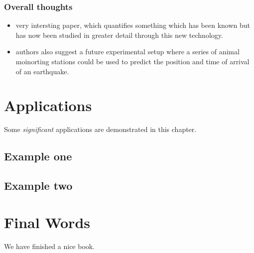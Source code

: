 \documentclass[
]{book}
\begin{document}
\hypertarget{overall-thoughts}{%
\subsection{Overall thoughts}\label{overall-thoughts}}

\begin{itemize}
\item
  very intersting paper, which quantifies something which has been known but has now been studied in greater detail through this new technology.
\item
  authors also suggest a future experimental setup where a series of animal moinorting stations could be used to predict the position and time of arrival of an earthquake.
\end{itemize}

\hypertarget{applications}{%
\chapter{Applications}\label{applications}}

Some \emph{significant} applications are demonstrated in this chapter.

\hypertarget{example-one}{%
\section{Example one}\label{example-one}}

\hypertarget{example-two}{%
\section{Example two}\label{example-two}}

\hypertarget{final-words}{%
\chapter{Final Words}\label{final-words}}

We have finished a nice book.

  
\end{document}
